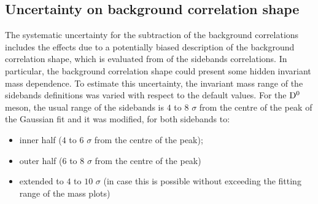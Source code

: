 \subsection{Uncertainty on background correlation shape}
The systematic uncertainty for the subtraction of the background correlations includes the effects due to a potentially biased description of the background correlation shape, which is evaluated from of the sidebands correlations. In particular, the background correlation shape could present some hidden invariant mass dependence. To estimate this uncertainty, the invariant mass range of the sidebands definitions was varied with respect to the default values. For the ${\rm D^0}$ meson, the usual range of the sidebands is $4$ to $8$ $\sigma$ from the centre of the peak of the Gaussian fit and it was modified, for both sidebands to:
\begin{itemize}
    \item inner half ($4$ to $6$ $\sigma$ from the centre of the peak);
    \item outer half ($6$ to $8$ $\sigma$ from the centre of the peak)
    \item extended to $4$ to $10$ $\sigma$ (in case this is possible without exceeding the fitting range of the mass plots)
\end{itemize}

